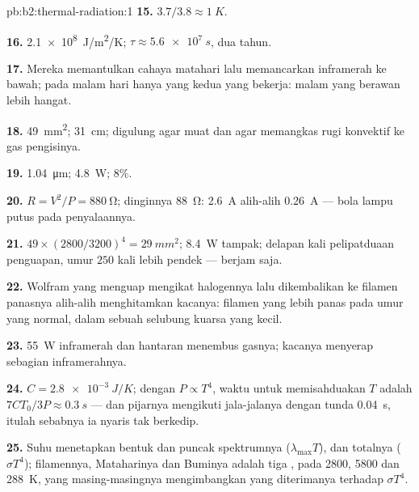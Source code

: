 \begin{solution}{pb:b2:thermal-radiation:1}
\textbf{15.} $3.7/3.8 \approx \qty{1}{K}$.

\textbf{16.} \qty{2.1e8}{J/m^2/K}; $\tau \approx \qty{5.6e7}{s}$, dua tahun.

\textbf{17.} Mereka memantulkan cahaya matahari lalu memancarkan inframerah ke bawah; pada malam hari
hanya yang kedua yang bekerja: malam yang berawan lebih hangat.

\textbf{18.} \qty{49}{mm^2}; \qty{31}{cm}; digulung agar muat dan agar memangkas
rugi konvektif ke gas pengisinya.

\textbf{19.} \qty{1.04}{\micro m}; \qty{4.8}{W}; $8\%$.

\textbf{20.} $R = V^2/P = \qty{880}{\ohm}$; dinginnya \qty{88}{\ohm}: \qty{2.6}{A}
alih-alih \qty{0.26}{A} --- bola lampu putus pada penyalaannya.

\textbf{21.} $49 \times (2800/3200)^4 = \qty{29}{mm^2}$; \qty{8.4}{W} tampak; delapan
kali pelipatduaan penguapan, umur $250$ kali lebih pendek --- berjam saja.

\textbf{22.} Wolfram yang menguap mengikat halogennya lalu dikembalikan
ke filamen panasnya alih-alih menghitamkan kacanya: filamen yang lebih panas
pada umur yang normal, dalam sebuah selubung kuarsa yang kecil.

\textbf{23.} \qty{55}{W} inframerah dan hantaran menembus gasnya;
kacanya menyerap sebagian inframerahnya.

\textbf{24.} $C = \qty{2.8e-3}{J/K}$; dengan $P \propto T^4$, waktu untuk memisahduakan $T$
adalah $7CT_0/3P \approx \qty{0.3}{s}$ --- dan pijarnya mengikuti jala-jalanya
dengan tunda \qty{0.04}{s}, itulah sebabnya ia nyaris tak berkedip.

\textbf{25.} Suhu menetapkan bentuk dan puncak spektrumnya
($\lambda_{\max}T$), dan totalnya ($\sigma T^4$); filamennya, Mataharinya dan Buminya
adalah tiga , pada \qty{2800}{}, \qty{5800}{} dan \qty{288}{K}, yang masing-masingnya
mengimbangkan yang diterimanya terhadap $\sigma T^4$.
\end{solution}
